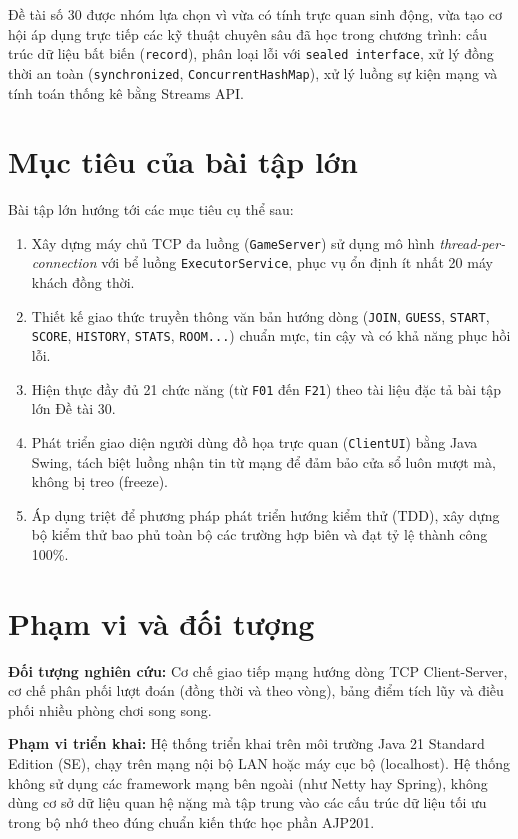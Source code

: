 \documentclass[12pt,a4paper,oneside]{report}
\begin{document}
Đề tài số 30 được nhóm lựa chọn vì vừa có tính trực quan sinh động, vừa tạo cơ hội áp dụng trực tiếp các kỹ thuật chuyên sâu đã học trong chương trình: cấu trúc dữ liệu bất biến (\texttt{record}), phân loại lỗi với \texttt{sealed interface}, xử lý đồng thời an toàn (\texttt{synchronized}, \texttt{ConcurrentHashMap}), xử lý luồng sự kiện mạng và tính toán thống kê bằng Streams API.

\section{Mục tiêu của bài tập lớn}
Bài tập lớn hướng tới các mục tiêu cụ thể sau:
\begin{enumerate}
  \item Xây dựng máy chủ TCP đa luồng (\texttt{GameServer}) sử dụng mô hình \textit{thread-per-connection} với bể luồng \texttt{ExecutorService}, phục vụ ổn định ít nhất 20 máy khách đồng thời.
  \item Thiết kế giao thức truyền thông văn bản hướng dòng (\texttt{JOIN}, \texttt{GUESS}, \texttt{START}, \texttt{SCORE}, \texttt{HISTORY}, \texttt{STATS}, \texttt{ROOM...}) chuẩn mực, tin cậy và có khả năng phục hồi lỗi.
  \item Hiện thực đầy đủ 21 chức năng (từ \texttt{F01} đến \texttt{F21}) theo tài liệu đặc tả bài tập lớn Đề tài 30.
  \item Phát triển giao diện người dùng đồ họa trực quan (\texttt{ClientUI}) bằng Java Swing, tách biệt luồng nhận tin từ mạng để đảm bảo cửa sổ luôn mượt mà, không bị treo (freeze).
  \item Áp dụng triệt để phương pháp phát triển hướng kiểm thử (TDD), xây dựng bộ kiểm thử bao phủ toàn bộ các trường hợp biên và đạt tỷ lệ thành công 100\%.
\end{enumerate}

\section{Phạm vi và đối tượng}
\textbf{Đối tượng nghiên cứu:} Cơ chế giao tiếp mạng hướng dòng TCP Client-Server, cơ chế phân phối lượt đoán (đồng thời và theo vòng), bảng điểm tích lũy và điều phối nhiều phòng chơi song song.

\textbf{Phạm vi triển khai:} Hệ thống triển khai trên môi trường Java 21 Standard Edition (SE), chạy trên mạng nội bộ LAN hoặc máy cục bộ (localhost). Hệ thống không sử dụng các framework mạng bên ngoài (như Netty hay Spring), không dùng cơ sở dữ liệu quan hệ nặng mà tập trung vào các cấu trúc dữ liệu tối ưu trong bộ nhớ theo đúng chuẩn kiến thức học phần AJP201.
\end{document}
